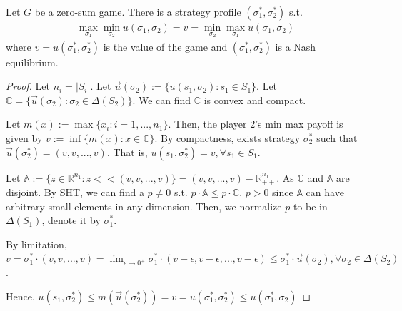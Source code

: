 \documentclass[11pt]{elegantbook_2}
\begin{document}
\begin{theorem}
    Let $G$ be a zero-sum game. There is a strategy profile $(\sigma_1^*, \sigma_2^*)$ s.t.
    \begin{equation}
        \begin{aligned}
            \max_{\sigma_1}\min_{\sigma_2}u(\sigma_1,\sigma_2)=v= \min_{\sigma_2}\max_{\sigma_1}u(\sigma_1,\sigma_2)
        \end{aligned}
        \nonumber
    \end{equation}
    where $v=u(\sigma_1^*, \sigma_2^*)$ is the value of the game and $(\sigma_1^*, \sigma_2^*)$ is a Nash equilibrium.
\end{theorem}
\begin{proof}
    Let $n_i=|S_i|$. Let $\vec{u}(\sigma_2):=\{u(s_1,\sigma_2):s_1\in S_1\}$. Let $\mathbb{C}=\{\vec{u}(\sigma_2):\sigma_2\in \Delta(S_2)\}$. We can find $\mathbb{C}$ is convex and compact.

    Let $m(x):=\max\{x_i:i=1,...,n_1\}$. Then, the player 2's min max payoff is given by $v:=\inf\{m(x):x\in \mathbb{C}\}$. By compactness, exists strategy $\sigma_2^*$ such that $\vec{u}(\sigma_2^*)=(v,v,...,v)$. That is, $u(s_1,\sigma_2^*)=v,\forall s_1\in S_1$.

    Let $\mathbb{A}:=\{z\in \mathbb{R}^{n_1}:z<<(v,v,...,v)\}=(v,v,...,v)-\mathbb{R}^{n_1}_{++}$. As $\mathbb{C}$ and $\mathbb{A}$ are disjoint. By SHT, we can find a $p\neq 0$ s.t. $p\cdot \mathbb{A}\leq p\cdot \mathbb{C}$. $p>0$ since $\mathbb{A}$ can have arbitrary small elements in any dimension. Then, we normalize $p$ to be in $\Delta(S_1)$, denote it by $\sigma^*_1$.

    By limitation, $v=\sigma^*_1\cdot(v,v,...,v)=\lim_{\epsilon \rightarrow 0^+}\sigma^*_1\cdot (v-\epsilon,v-\epsilon,...,v-\epsilon)\leq \sigma^*_1\cdot\vec{u}(\sigma_2),\forall \sigma_2\in \Delta(S_2)$.

    Hence, $u(s_1,\sigma_2^*)\leq m(\vec{u}(\sigma_2^*))=v=u(\sigma_1^*,\sigma_2^*)\leq u(\sigma_1^*,\sigma_2)$
\end{proof}
\end{document}
